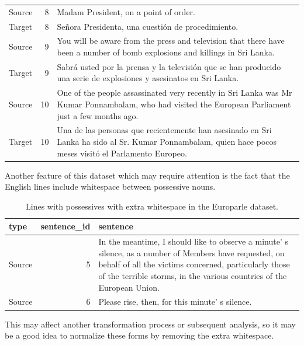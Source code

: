 \documentclass[
  letterpaper,
]{latex/krantz}
\begin{document}
\begin{table}
\begin{tabular}{lrl}
\addlinespace
Source & 8 & Madam President, on a point of order.\\
Target & 8 & Señora Presidenta, una cuestión de procedimiento.\\
Source & 9 & You will be aware from the press and television that there have been a number of bomb explosions and killings in Sri Lanka.\\
Target & 9 & Sabrá usted por la prensa y la televisión que se han producido una serie de explosiones y asesinatos en Sri Lanka.\\
Source & 10 & One of the people assassinated very recently in Sri Lanka was Mr Kumar Ponnambalam, who had visited the European Parliament just a few months ago.\\
\addlinespace
Target & 10 & Una de las personas que recientemente han asesinado en Sri Lanka ha sido al Sr. Kumar Ponnambalam, quien hace pocos meses visitó el Parlamento Europeo.\\
\bottomrule
\end{tabular}
\end{table}

Another feature of this dataset which may require attention is the fact
that the English lines include whitespace between possessive nouns.

\hypertarget{tbl-normalize-whitespace-identify-europarle}{}
\begin{table}
\caption{\label{tbl-normalize-whitespace-identify-europarle}Lines with possessives with extra whitespace in the Europarle dataset. }\tabularnewline

\centering
\begin{tabular}{lrl}
\toprule
type & sentence\_id & sentence\\
\midrule
Source & 5 & In the meantime, I should like to observe a minute' s silence, as a number of Members have requested, on behalf of all the victims concerned, particularly those of the terrible storms, in the various countries of the European Union.\\
Source & 6 & Please rise, then, for this minute' s silence.\\
\bottomrule
\end{tabular}
\end{table}

This may affect another transformation process or subsequent analysis,
so it may be a good idea to normalize these forms by removing the extra
whitespace.
\end{document}
